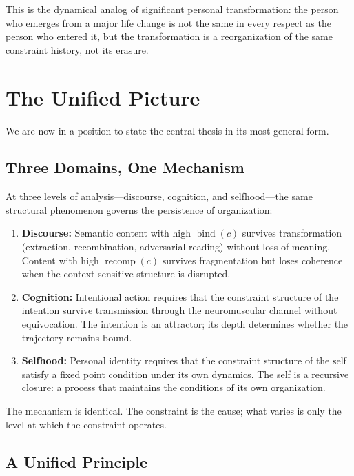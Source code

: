\documentclass[11pt]{article}
\newcommand{\bind}{\operatorname{bind}}
\newcommand{\recomp}{\operatorname{recomp}}
\begin{document}
This is the dynamical analog of significant personal transformation: the person who
emerges from a major life change is not the same in every respect as the person who
entered it, but the transformation is a reorganization of the same constraint history,
not its erasure.

\section{The Unified Picture}

We are now in a position to state the central thesis in its most general form.

\subsection{Three Domains, One Mechanism}

At three levels of analysis—discourse, cognition, and selfhood—the same structural
phenomenon governs the persistence of organization:

\begin{enumerate}
  \item \textbf{Discourse:} Semantic content with high $\bind(c)$ survives transformation
        (extraction, recombination, adversarial reading) without loss of meaning. Content
        with high $\recomp(c)$ survives fragmentation but loses coherence when the
        context-sensitive structure is disrupted.

  \item \textbf{Cognition:} Intentional action requires that the constraint structure of
        the intention survive transmission through the neuromuscular channel without
        equivocation. The intention is an attractor; its depth determines whether the
        trajectory remains bound.

  \item \textbf{Selfhood:} Personal identity requires that the constraint structure of
        the self satisfy a fixed point condition under its own dynamics. The self is a
        recursive closure: a process that maintains the conditions of its own organization.
\end{enumerate}

The mechanism is identical. The constraint is the cause; what varies is only the level
at which the constraint operates.

\subsection{A Unified Principle}
\end{document}
